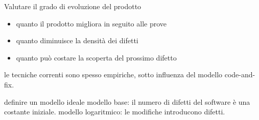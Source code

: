 Valutare il grado di evoluzione del prodotto
\begin{itemize}
  \item quanto il prodotto migliora in seguito alle prove
  \item quanto diminuisce la densità dei difetti
  \item quanto può costare la scoperta del prossimo difetto
\end{itemize}

le tecniche correnti sono spesso empiriche, sotto influenza del modello
code-and-fix.

definire un modello ideale
modello base: il numero di difetti del software è una costante iniziale.
modello logaritmico: le modifiche introducono difetti.


